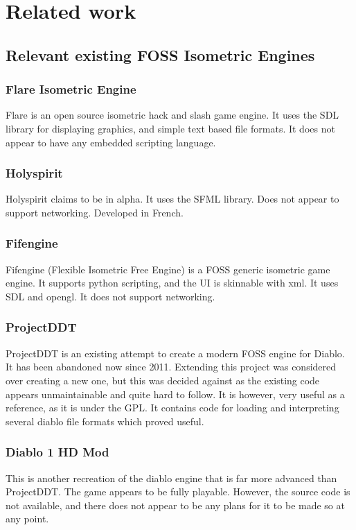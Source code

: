 \chapter{Related work}
    \section{Relevant existing FOSS Isometric Engines}
    	\subsection{Flare Isometric Engine}
    	Flare\cite{flare} is an open source isometric hack and slash game engine. It uses the SDL library for displaying graphics, and simple text based file formats.
    	It does not appear to have any embedded scripting language.
    	
    	\subsection{Holyspirit}
    	Holyspirit\cite{holyspirit} claims to be in alpha. It uses the SFML library. Does not appear to support networking.
    	Developed in French.
    	
    	\subsection{Fifengine}
    	Fifengine\cite{fife} (Flexible Isometric Free Engine) is a FOSS generic isometric game engine.
    	It supports python scripting, and the UI is skinnable with xml.
    	It uses SDL and opengl. It does not support networking.
    	
    	\subsection{ProjectDDT}
    	ProjectDDT\cite{ddt} is an existing attempt to create a modern FOSS engine for Diablo.
    	It has been abandoned now since 2011.
    	Extending this project was considered over creating a new one, but this was decided against as the existing code appears unmaintainable and quite hard to follow.
    	It is however, very useful as a reference, as it is under the GPL.
    	It contains code for loading and interpreting several diablo file formats which proved useful.
    	
    	\subsection{Diablo 1 HD Mod}
    	This\cite{d1hd} is another recreation of the diablo engine that is far more advanced than ProjectDDT. The game appears to be fully playable. However, the source code is not available, and there does not appear to be any plans for it to be made so at any point.
